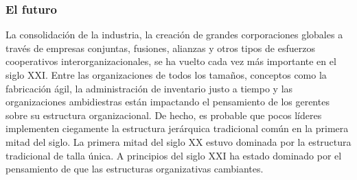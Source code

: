 \documentclass[10pt]{book}
\begin{document}
\subsubsection{El futuro}
La consolidación de la industria, la creación de grandes corporaciones globales a través de empresas conjuntas, fusiones, alianzas y otros tipos de esfuerzos cooperativos interorganizacionales, se ha vuelto cada vez más importante en el siglo XXI. Entre las organizaciones de todos los tamaños, conceptos como la fabricación ágil, la administración de inventario justo a tiempo y las organizaciones ambidiestras están impactando el pensamiento de los gerentes sobre su estructura organizacional. De hecho, es probable que pocos líderes implementen ciegamente la estructura jerárquica tradicional común en la primera mitad del siglo. La primera mitad del siglo XX estuvo dominada por la estructura tradicional de talla única. A principios del siglo XXI ha estado dominado por el pensamiento de que las estructuras organizativas cambiantes.
\end{document}
